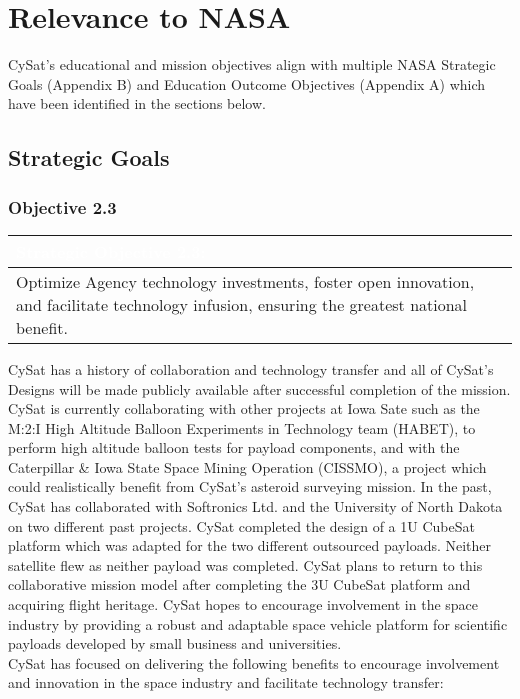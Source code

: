 \documentclass[nocover]            %
{CSLI}                       %
\begin{document}
\section{Relevance to NASA}
CySat's educational and mission objectives align with multiple NASA Strategic Goals (Appendix B) and Education Outcome Objectives (Appendix A) which have been identified in the sections below.
\subsection{Strategic Goals}

\subsubsection{Objective 2.3}
\begin{table}[H]
\centering
\begin{tabular}{| p{\textwidth} |}
\arrayrulecolor{white}
\hline
\rowcolor{gray!80}
\textcolor{white}{\textbf{Strategic Objective 2.3: }} \\ \hline
\rowcolor{gray!10}
Optimize Agency technology investments, foster open innovation, and facilitate technology infusion, ensuring the greatest national benefit.\\ \hline
\end{tabular}
\end{table}
CySat has a history of collaboration and technology transfer and all of CySat's Designs will be made publicly available after successful completion of the mission. CySat is currently collaborating with other projects at Iowa Sate such as the M:2:I High Altitude Balloon Experiments in Technology team (HABET), to perform high altitude balloon tests for payload components, and with the Caterpillar \& Iowa State Space Mining Operation (CISSMO), a project which could realistically benefit from CySat's asteroid surveying mission. In the past, CySat has collaborated with Softronics Ltd. and the University of North Dakota on two different past projects. CySat completed the design of a 1U CubeSat platform which was adapted for the two different outsourced payloads. Neither satellite flew as neither payload was completed. CySat plans to return to this collaborative mission model after completing the 3U CubeSat platform and acquiring flight heritage. CySat hopes to encourage involvement in the space industry by providing a robust and adaptable space vehicle platform for scientific payloads developed by small business and universities.\\
\indent CySat has focused on delivering the following benefits to encourage involvement and innovation in the space industry and facilitate technology transfer:
\end{document}
